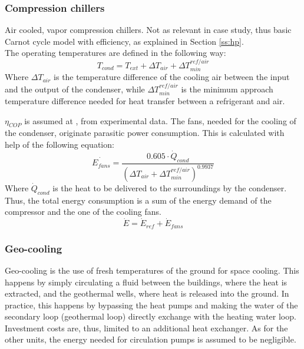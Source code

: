\documentclass{article}
\begin{document}
\subsubsection{Compression chillers}
Air cooled, vapor compression chillers. Not as relevant in case study, thus basic Carnot cycle model with efficiency, as explained in Section \ref{ss:hp}.\\
The operating temperatures are defined in the following way:
\begin{equation}
    T_{cond} = T_{ext} + \Delta T_{air} + \Delta T_{min}^{ref/air}
\end{equation}
Where $\Delta T_{air}$ is the temperature difference of the cooling air between the input and the output of the condenser, while $\Delta T_{min}^{ref/air}$ is the minimum approach temperature difference needed for heat transfer between a refrigerant and air.

$\eta_{COP}$ is assumed at , from experimental data\cite{girardinEnerGisGeographicalInformation2010}.
The fans, needed for the cooling of the condenser, originate parasitic power consumption. This is calculated with help of the following equation\cite{henchozPotentialRefrigerantBased}:
\begin{equation}
    \dot{E_{fans}} = \frac{0.605 \cdot \dot{Q}_{cond}}{( \Delta T_{air} + \Delta T_{min}^{ref/air})^{0.9937}}
\end{equation}
Where $\dot{Q}_{cond}$ is the heat to be delivered to the surroundings by the condenser. Thus, the total energy consumption is a sum of the energy demand of the compressor and the one of the cooling fans.
\begin{equation}
    \dot{E} = \dot{E}_{ref} + \dot{E}_{fans}
\end{equation}

\subsubsection{Geo-cooling}
Geo-cooling is the use of fresh temperatures of the ground for space cooling. This happens by simply circulating a fluid between the buildings, where the heat is extracted, and the geothermal wells, where heat is released into the ground. In practice, this happens by bypassing the heat pumps and making the water of the secondary loop (geothermal loop) directly exchange with the heating water loop. Investment costs are, thus, limited to an additional heat exchanger. As for the other units, the energy needed for circulation pumps is assumed to be negligible. 
\end{document}

